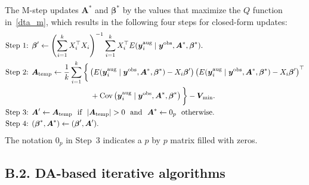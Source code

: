 \documentclass[12pt]{article}
\begin{document}
\begin{appendix}
The M-step updates $\boldsymbol{A}^\ast$ and $\boldsymbol{\beta}^\ast$ by the values that maximize the $Q$ function in~\eqref{dta_m}, which results in the following four steps for closed-form updates:
\begin{align}
\begin{aligned}
\textrm{Step 1: }& \boldsymbol{\beta}' \gets\left(\sum_{i=1}^kX_i^\top X_i\right)^{-1}\sum_{i=1}^kX_i^\top E(
\boldsymbol{y}^{\textrm{aug}}_i\mid \boldsymbol{y}^{\textrm{obs}}, \boldsymbol{A}^\ast, \boldsymbol{\beta}^\ast).\nonumber\\
\textrm{Step 2: }& \boldsymbol{A}_{\textrm{temp}}  \gets \frac{1}{k}\sum_{i=1}^k\bigg\{\left(E(\boldsymbol{y}^{\textrm{aug}}_i \mid \boldsymbol{y}^{\textrm{obs}}, \boldsymbol{A}^\ast, \boldsymbol{\beta}^\ast)-X_i\boldsymbol{\beta}'\right)\left(E(\boldsymbol{y}^{\textrm{aug}}_i\mid \boldsymbol{y}^{\textrm{obs}}, \boldsymbol{A}^\ast, \boldsymbol{\beta}^\ast)-X_i\boldsymbol{\beta}'\right)^\top\\
&\textcolor{white}{==========}+\textrm{Cov}\left(\boldsymbol{y}^{\textrm{aug}}_i\mid \boldsymbol{y}^{\textrm{obs}}, \boldsymbol{A}^\ast, \boldsymbol{\beta}^\ast\right)\bigg\}-\boldsymbol{V}\!_{\textrm{min}}.\\
\textrm{Step 3: }& \boldsymbol{A}'  \gets \boldsymbol{A}_{\textrm{temp}}~~\textrm{if}~~\vert \boldsymbol{A}_{\textrm{temp}}\vert>0~~ \textrm{and}~~ \boldsymbol{A}^\ast  \gets 0_p~~\textrm{otherwise}.\\
\textrm{Step 4: }& (\boldsymbol{\beta}^\ast, \boldsymbol{A}^\ast)  \gets (\boldsymbol{\beta}', \boldsymbol{A}').
\end{aligned}
\end{align}
The notation $0_p$ in Step~3 indicates a $p$ by $p$ matrix filled with zeros.


\subsection{B.2. DA-based iterative algorithms}\label{app222}



\end{appendix}
\end{document}
